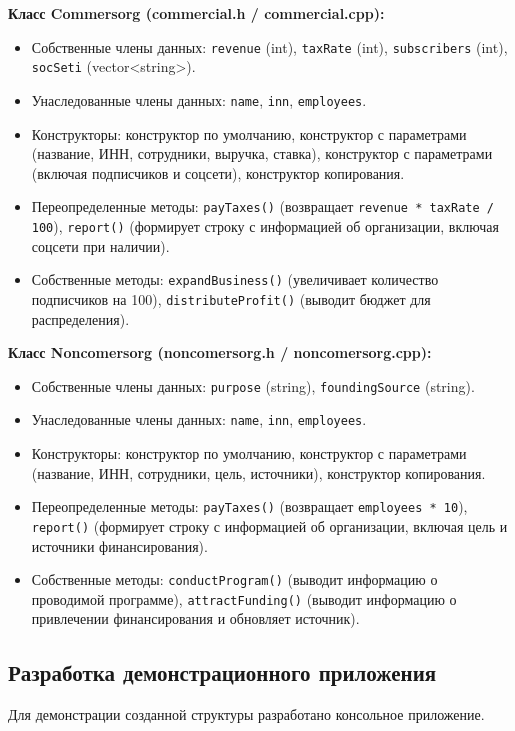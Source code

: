 \documentclass[oneside,a4paper,14pt]{extarticle}
\begin{document}
\textbf{Класс Commersorg (commercial.h / commercial.cpp):}
\begin{itemize}
	\item Собственные члены данных: \texttt{revenue} (int), \texttt{taxRate} (int), \texttt{subscribers} (int), \texttt{socSeti} (vector<string>).
	\item Унаследованные члены данных: \texttt{name}, \texttt{inn}, \texttt{employees}.
	\item Конструкторы: конструктор по умолчанию, конструктор с параметрами (название, ИНН, сотрудники, выручка, ставка), конструктор с параметрами (включая подписчиков и соцсети), конструктор копирования.
	\item Переопределенные методы: \texttt{payTaxes()} (возвращает \texttt{revenue * taxRate / 100}), \texttt{report()} (формирует строку с информацией об организации, включая соцсети при наличии).
	\item Собственные методы: \texttt{expandBusiness()} (увеличивает количество подписчиков на 100), \texttt{distributeProfit()} (выводит бюджет для распределения).
\end{itemize}

\newpage

\textbf{Класс Noncomersorg (noncomersorg.h / noncomersorg.cpp):}
\begin{itemize}
	\item Собственные члены данных: \texttt{purpose} (string), \texttt{foundingSource} (string).
	\item Унаследованные члены данных: \texttt{name}, \texttt{inn}, \texttt{employees}.
	\item Конструкторы: конструктор по умолчанию, конструктор с параметрами (название, ИНН, сотрудники, цель, источники), конструктор копирования.
	\item Переопределенные методы: \texttt{payTaxes()} (возвращает \texttt{employees * 10}), \texttt{report()} (формирует строку с информацией об организации, включая цель и источники финансирования).
	\item Собственные методы: \texttt{conductProgram()} (выводит информацию о проводимой программе), \texttt{attractFunding()} (выводит информацию о привлечении финансирования и обновляет источник).
\end{itemize}

\newpage

\subsection*{Разработка демонстрационного приложения}
Для демонстрации созданной структуры разработано консольное приложение.
\end{document}
